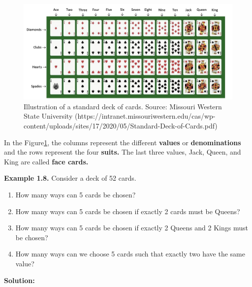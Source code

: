 \documentclass[
  12pt,
]{krantzNoCorner}
\providecommand{\tightlist}{%
  \setlength{\itemsep}{0pt}\setlength{\parskip}{0pt}}
\begin{document}
\begin{figure}
\includegraphics[width=0.9\linewidth,height=0.4\textheight]{deckofcards} \caption{Illustration of a standard deck of cards. Source: Missouri Western State University (https://intranet.missouriwestern.edu/cas/wp-content/uploads/sites/17/2020/05/Standard-Deck-of-Cards.pdf)}\label{fig:ExCardDeck}
\end{figure}

In the Figure\texttt{\ref{fig:ExCardDeck}}, the columns represent the different
\textbf{values} or \textbf{denominations} and the rows represent the four
\textbf{suits.} The last three values, Jack, Queen, and King are called
\textbf{face cards.}

\textbf{Example 1.8.} Consider a deck of 52 cards.

\begin{enumerate}
\def\labelenumi{\arabic{enumi}.}
\tightlist
\item
  How many ways can 5 cards be chosen?
\item
  How many ways can 5 cards be chosen if exactly 2 cards must be
  Queens?
\item
  How many ways can 5 cards be chosen if exactly 2 Queens and 2 Kings
  must be chosen?
\item
  How many ways can we choose 5 cards such that exactly two have the
  same value?
\end{enumerate}

\textbf{Solution:}
\end{document}

